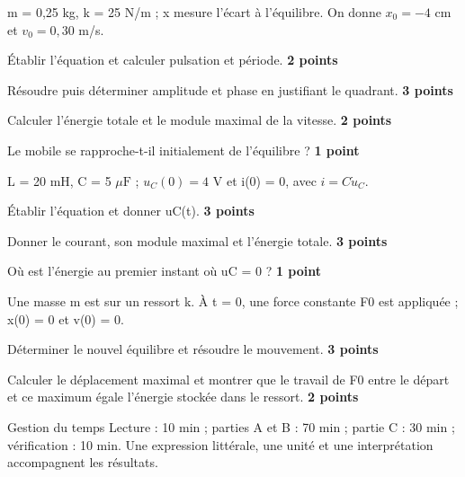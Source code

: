 m = 0,25 kg, k = 25 N/m ; x mesure l’écart à l’équilibre. On donne $x_0=-4$ cm et $v_0=0{,}30$ m/s.
\begin{questions}
\item Établir l’équation et calculer pulsation et période. \textbf{2 points}
\item Résoudre puis déterminer amplitude et phase en justifiant le quadrant. \textbf{3 points}
\item Calculer l’énergie totale et le module maximal de la vitesse. \textbf{2 points}
\item Le mobile se rapproche-t-il initialement de l’équilibre ? \textbf{1 point}
\end{questions}
L = 20 mH, C = 5 $\mu\mathrm{ F}$ ; $u_C(0)=4$ V et i(0) = 0, avec $i=C\dot u_C$.
\begin{questions}
\item Établir l’équation et donner uC(t). \textbf{3 points}
\item Donner le courant, son module maximal et l’énergie totale. \textbf{3 points}
\item Où est l’énergie au premier instant où uC = 0 ? \textbf{1 point}
\end{questions}


Une masse m est sur un ressort k. À t = 0, une force constante F0 est appliquée ; x(0) = 0 et v(0) = 0.
\begin{questions}
\item Déterminer le nouvel équilibre et résoudre le mouvement. \textbf{3 points}
\item Calculer le déplacement maximal et montrer que le travail de F0 entre le départ et ce maximum égale l’énergie stockée dans le ressort. \textbf{2 points}
\end{questions}
\begin{docu}{Gestion du temps}
Lecture : 10 min ; parties A et B : 70 min ; partie C : 30 min ; vérification : 10 min. Une expression littérale, une unité et une interprétation accompagnent les résultats.
\end{docu}


